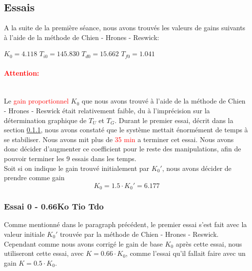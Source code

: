 \subsection{Essais}
A la suite de la première séance, nous avons trouvés les valeurs de gains suivants
à l'aide de la méthode de Chien - Hrones - Reswick:

\begin{center}
    $K_0  = 4.118$
    \hspace{1cm}
    $T_{i0} = 145.830$
    \hspace{1cm}
    $T_{d0} = 15.662$
    \hspace{1cm}
    $T_{f0} = 1.041$
\end{center}

\paragraph{\textcolor{red}{Attention:}}\mbox{}\\
Le \textcolor{red}{gain proportionnel} $K_0$ que nous avons trouvé à l'aide de la méthode de 
Chien - Hrones - Reswick était relativement faible, du à l'imprécision 
sur la détermination graphique de $T_{U}$ et $T_{G}$. Durant le premier essai,
décrit dans la section \ref{essai-0}, nous avons constaté que le système mettait
énormément de temps à se stabiliser. Nous avons mit plus de \textcolor{red}{35 min}
a terminer cet essai. Nous avons donc décider d'augmenter ce coefficient pour le
reste des manipulations, afin de pouvoir terminer les 9 essais dans les temps.\\

Soit si on indique le gain trouvé initialement par $K_0'$, nous avons décider de 
prendre comme gain $$K_0 = 1.5 \cdot K_0' = 6.177$$


\subsubsection{Essai 0 - 0.66Ko Tio Tdo} \label{essai-0}
Comme mentionné dans le paragraph précédent, le premier essai s'est fait avec
la valeur initiale $K_0'$ trouvée par la méthode de Chien - Hrones - Reswick.
Cependant comme nous avons corrigé le gain de base $K_0$ après cette essai, nous
utiliseront cette essai, avec $K = 0.66 \cdot K_0$, comme l'essai qu'il fallait
faire avec un gain $K = 0.5 \cdot K_0$.

